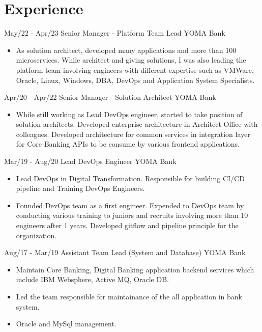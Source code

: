 \documentclass[]{friggeri-cv}
\begin{document}
\section{Experience}
\begin{entrylist}
  \entry
    {May/22 - Apr/23}
    {Senior Manager - Platform Team Lead}
    {YOMA Bank}
    { \begin{itemize}
      \item As solution architect, developed many applications and more than 100 microservices. While architect and giving solutions, I was also leading the platform team involving engineers with different expertise such as VMWare, Oracle, Linux, Windows, DBA, DevOps and Application System Specialists.
      \end{itemize}
    }

  \entry
    {Apr/20 - Apr/22}
    {Senior Manager - Solution Architect}
    {YOMA Bank}
    { \begin{itemize}
      \item While still working as Lead DevOps engineer, started to take position of solution architects. 
      Developed enterprise architecture in Architect Office with colleagues. Developed architecture for common services in integration layer for Core Banking APIs to be consume by various frontend applications.
      \end{itemize}
    }
  \entry
    {Mar/19 - Aug/20}
    {Lead DevOps Engineer}
    {YOMA Bank}
    { \begin{itemize}
        \item Lead DevOps in Digital Transformation. Responsible for building CI/CD pipeline and Training DevOps Engineers.
        \item Founded DevOps team as a first engineer. Expended to DevOps team by conducting various training to juniors and recruits involving more than 10 engineers after 1 years. Developed gitflow and pipeline principle for the organization.
      \end{itemize}
    }
  \entry
    {Aug/17 - Mar/19}
    {Assistant Team Lead (System and Database)}
    {YOMA Bank}
    {
      \begin{itemize}
        \item Maintain Core Banking, Digital Banking application backend services which include IBM Websphere, Active MQ, Oracle DB.
        \item Led the team responsible for maintainance of the all application in bank system.
        \item Oracle and MySql management.

\end{itemize}}
\end{entrylist}
\end{document}
